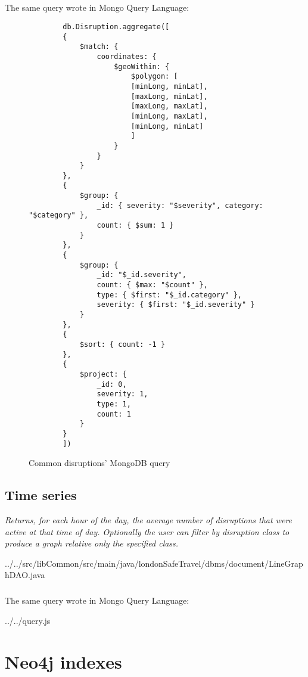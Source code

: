 \paragraph{}
The same query wrote in Mongo Query Language:
\begin{figure}[H]
	\begin{lstlisting}
		db.Disruption.aggregate([
		{
			$match: {
				coordinates: {
					$geoWithin: {
						$polygon: [
						[minLong, minLat],
						[maxLong, minLat],
						[maxLong, maxLat],
						[minLong, maxLat],
						[minLong, minLat]
						]
					}
				}
			}
		},
		{
			$group: {
				_id: { severity: "$severity", category: "$category" },
				count: { $sum: 1 }
			}
		},
		{
			$group: {
				_id: "$_id.severity",
				count: { $max: "$count" },
				type: { $first: "$_id.category" },
				severity: { $first: "$_id.severity" }
			}
		},
		{
			$sort: { count: -1 }
		},
		{
			$project: {
				_id: 0,
				severity: 1,
				type: 1,
				count: 1
			}
		}
		])
	\end{lstlisting}
	\caption{Common disruptions' MongoDB query}
\end{figure}

\section{Time series}
\textit{Returns, for each hour of the day, the average number of disruptions that were active at that time of day. Optionally the user can filter by disruption class to produce a graph relative only the specified class.}


{../../src/libCommon/src/main/java/londonSafeTravel/dbms/document/LineGraphDAO.java}

\paragraph{}
The same query wrote in Mongo Query Language:

{../../query.js}


\chapter{Neo4j indexes}


